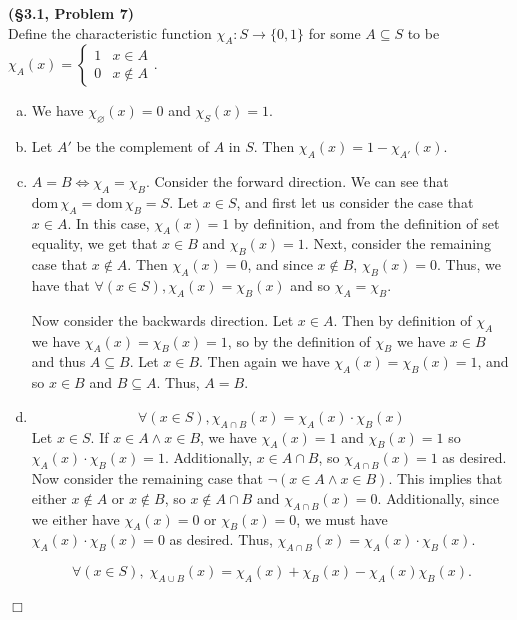 \documentclass[12pt]{article}
\theoremstyle{definition}
\newenvironment{Solution}{\noindent {\sc Solution.}}{$\Box$ \vspace{2 ex}}
\newcommand{\dom}{\mathrm{dom}}
\begin{document}
\vspace{1cm}

\begin{Solution}
{\bf (\S3.1, Problem 7)}\\
Define the characteristic function $\chi_A:S \to \{0,1\}$ for some $A\subseteq S$ to be $\chi_A(x)=\begin{cases}1 & x \in A \\ 0 & x \not \in A\end{cases}$. 
\begin{enumerate}[(a)]
    \item We have $\chi_\varnothing(x)=0$ and $\chi_S(x)=1$.
    \item Let $A'$ be the complement of $A$ in $S$. Then $\chi_A(x)=1-\chi_{A'}(x)$.
    \item $A=B\iff \chi_A=\chi_B$. Consider the forward direction. We can see that $\dom\,\chi_A=\dom\,\chi_B=S$. Let $x\in S$, and first let us consider the case that $x \in A$. In this case, $\chi_A(x)=1$ by definition, and from the definition of set equality, we get that $x \in B$ and $\chi_B(x)=1$. Next, consider the remaining case that $x \not\in A$. Then $\chi_A(x)=0$, and since $x\not\in B$, $\chi_B(x)=0$. Thus, we have that $\forall(x\in S),\chi_A(x)=\chi_B(x)$ and so $\chi_A = \chi_B$.

    Now consider the backwards direction. Let $x \in A$. Then by definition of $\chi_A$ we have $\chi_A(x)=\chi_B(x)=1$, so by the definition of $\chi_B$ we have $x \in B$ and thus $A \subseteq B$. Let $x \in B$. Then again we have $\chi_A(x)=\chi_B(x)=1$, and so $x \in B$ and $B \subseteq A$. Thus, $A=B$.

    \item \[\forall(x\in S), \chi_{A \cap B}(x)= \chi_A(x) \cdot \chi_B(x)\]
    Let $x \in S$. If $x \in A \land x \in B$, we have $\chi_A(x) = 1$ and $\chi_B(x)=1$ so $\chi_A(x)\cdot\chi_B(x)=1$. Additionally, $x \in A \cap B$, so $\chi_{A\cap B} (x)=1$ as desired. Now consider the remaining case that $\lnot(x \in A\land x\in B)$. This implies that either $x\not\in A$ or $x \not\in B$, so $x \not\in A \cap B$ and $\chi_{A\cap B}(x)=0$. Additionally, since we either have $\chi_A(x)=0$ or $\chi_B(x)=0$, we must have  $\chi_A(x)\cdot\chi_B(x)=0$ as desired. Thus, $\chi_{A\cap B}(x)=\chi_A(x)\cdot\chi_B(x)$.

    \[\forall(x\in S), \; \chi_{A\cup B}(x) = \chi_A(x)+\chi_B(x)-\chi_A(x)\chi_B(x).\]


\end{enumerate}
\end{Solution}
\end{document}
